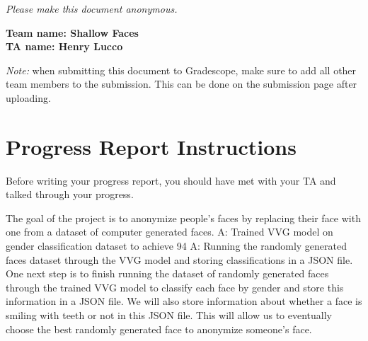 \emph{Please make this document anonymous.}

\textbf{Team name: Shallow Faces}\\
\textbf{TA name: Henry Lucco}

\emph{Note:} when submitting this document to Gradescope, make sure to add all other team members to the submission. This can be done on the submission page after uploading.

\section*{Progress Report Instructions}

Before writing your progress report, you should have met with your TA and talked through your progress.

%
The goal of the project is to anonymize people's faces by replacing their face with one from a dataset of computer generated faces.
% 
%
A: Trained VVG model on gender classification dataset to achieve 94%
% 
A: Running the randomly generated faces dataset through the VVG model and storing classifications in a JSON file.  
%
%
One next step is to finish running the dataset of randomly generated faces through the trained VVG model to classify each face by gender and store this information in a JSON file. We will also store information about whether a face is smiling with teeth or not in this JSON file. This will allow us to eventually choose the best randomly generated face to anonymize someone's face. 
%


